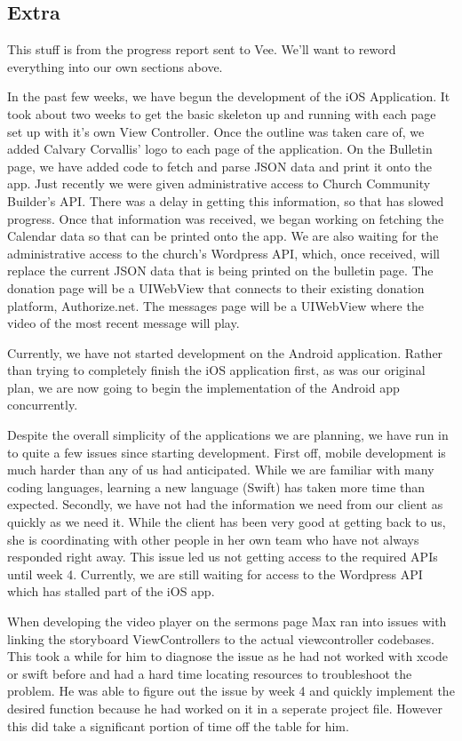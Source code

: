 \documentclass[letterpaper,10pt,draftclsnofoot,onecolumn,titlepage]{IEEEtran}
\begin{document}
	\subsection{Extra}

	This stuff is from the progress report sent to Vee. We'll want to reword everything into our own sections above.

		In the past few weeks, we have begun the development of the iOS Application.
		It took about two weeks to get the basic skeleton up and running with each page set up with it's own View Controller.
		Once the outline was taken care of, we added Calvary Corvallis' logo to each page of the application.
		On the Bulletin page, we have added code to fetch and parse JSON data and print it onto the app.
		Just recently we were given administrative access to Church Community Builder's API.
		There was a delay in getting this information, so that has slowed progress.
		Once that information was received, we began working on fetching the Calendar data so that can be printed onto the app.
		We are also waiting for the administrative access to the church's Wordpress API, which, once received, will replace the current JSON data that is being printed on the bulletin page.
		The donation page will be a UIWebView that connects to their existing donation platform, Authorize.net.
		The messages page will be a UIWebView where the video of the most recent message will play.

		Currently, we have not started development on the Android application.
		Rather than trying to completely finish the iOS application first, as was our original plan, we are now going to begin the implementation of the Android app concurrently.

		Despite the overall simplicity of the applications we are planning, we have run in to quite a few issues since starting development.
		First off, mobile development is much harder than any of us had anticipated.
		While we are familiar with many coding languages, learning a new language (Swift) has taken more time than expected.
		Secondly, we have not had the information we need from our client as quickly as we need it.
		While the client has been very good at getting back to us, she is coordinating with other people in her own team who have not always responded right away.
		This issue led us not getting access to the required APIs until week 4.
		Currently, we are still waiting for access to the Wordpress API which has stalled part of the iOS app.

		When developing the video player on the sermons page Max ran into issues with linking the storyboard ViewControllers to the actual viewcontroller codebases.
		This took a while for him to diagnose the issue as he had not worked with xcode or swift before and had a hard time locating resources to troubleshoot the problem.
		He was able to figure out the issue by week 4 and quickly implement the desired function because he had worked on it in a seperate project file.
		However this did take a significant portion of time off the table for him.
\end{document}
